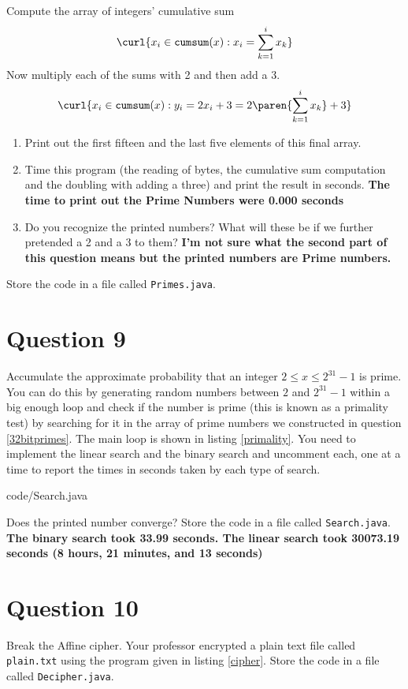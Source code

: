 \documentclass{article}
\newcommand\callit[1]{Store the code in a file called \texttt{#1}.}
\begin{document}
Compute the array of integers' cumulative sum \ie
\[
  \curl{x_i \in \mathtt{cumsum}(x) : x_i = \sum_{k=1}^{i} x_k}
\]
Now multiply each of the sums with 2 and then add a 3.
\[
  \curl{x_i \in \mathtt{cumsum}(x) :
    y_i = 2x_i+3 = 2\paren{\sum_{k=1}^{i} x_k}+3}
\]
\begin{enumerate}
  \item Print out the first fifteen and the last five elements of this
        final array.
  \item Time this program (the reading of bytes, the cumulative sum
        computation and the doubling with adding a three) and print the
        result in seconds. 
\textbf{The time to print out the Prime Numbers were 0.000 seconds}
  \item Do you recognize the printed numbers? What will these be if we
        further pretended a 2 and a 3 to them?
\textbf{I'm not sure what the second part of this question means but the printed numbers are Prime numbers.}
    
\end{enumerate}

\callit{Primes.java}

\section {Question 9} Accumulate the approximate probability that an integer $2 \leq x
  \leq 2^{31}-1$ is prime. You can do this by generating random
numbers between $2$ and $2^{31}-1$ within a big enough loop and
check if the number is prime (this is known as a primality test)
by searching for it in the array of prime numbers we constructed
in
question \ref{32bitprimes}.  The main loop is shown in listing
\ref{primality}.  You need to implement the linear search and the
binary search and uncomment each, one at a time to report the times in
seconds taken by each type of search.


{code/Search.java}

Does the printed number converge? \callit{Search.java}
\textbf{The binary search took 33.99 seconds. 
The linear search took 30073.19 seconds (8 hours, 21 minutes, and 13 seconds) 
}
\section {Question 10} Break the Affine cipher. Your professor encrypted a plain text
file called \texttt{plain.txt} using the program given in listing
\ref{cipher}. \callit{Decipher.java}
\end{document}
